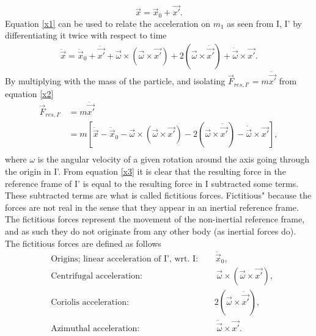 \begin{equation}
	\vec{x}=\vec{x}_0+\vec{x'}.
	\label{x1}
\end{equation} 
Equation \eqref{x1} can be used to relate the acceleration on $m_1$ as seen from I, I' by differentiating it twice with respect to time
\begin{equation}
	\begin{split}
		\ddot{\vec{x}}=\ddot{\vec{x}}_0+\ddot{\vec{x'}}+\vec{\omega}\times (\vec{\omega}\times \vec{x'})+2(\vec{\omega}\times \dot{\vec{x'}})+\dot{\vec{\omega}}\times \vec{x'}.
	\end{split}
	\label{x2}
\end{equation} 
By multiplying with the mass of the particle, and isolating $\vec{F}_{res,I'}=m\ddot{\vec{x'}}$ from equation \eqref{x2}
\begin{equation}
	\begin{split}
		\vec{F}_{res,I'}&=m\ddot{\vec{x'}}\\
		&=m[\ddot{\vec{x}}-\ddot{\vec{x}}_0-\vec{\omega}\times (\vec{\omega}\times \vec{x'})-2(\vec{\omega}\times \dot{\vec{x'}})-\dot{\vec{\omega}}\times \vec{x'}],\\
	\end{split}
	\label{x3}
\end{equation} 
where $\omega$ is the angular velocity of a given rotation around the axis going through the origin in I'. From equation \eqref{x3} it is clear that the resulting force in the reference frame of I' is equal to the resulting force in I subtracted some terms. These subtracted terms are what is called fictitious forces. Fictitious" because the forces are not real in the sense that they appear in an inertial reference frame. The fictitious forces represent the movement of the non-inertial reference frame, and as such they do not originate from any other body (as inertial forces do). The fictitious forces are defined as follows
\begin{equation}
	\begin{split}
		&\text{Origins; linear acceleration of I', wrt. I:}\qquad \ddot{\vec{x}}_0,\\
		&\text{Centrifugal acceleration:}\quad\qquad\quad\qquad\qquad\,\,\,\, \vec{\omega}\times (\vec{\omega}\times \vec{x'}),\\
		&\text{Coriolis acceleration: }\qquad\quad\quad\qquad\quad\qquad\,\,\,\, 2(\vec{\omega}\times \dot{\vec{x'}}),\\
		&\text{Azimuthal acceleration: }\qquad\quad\quad\qquad\qquad\,\,\,\, \dot{\vec{\omega}}\times \vec{x'}.\\
	\end{split}
\end{equation} 
